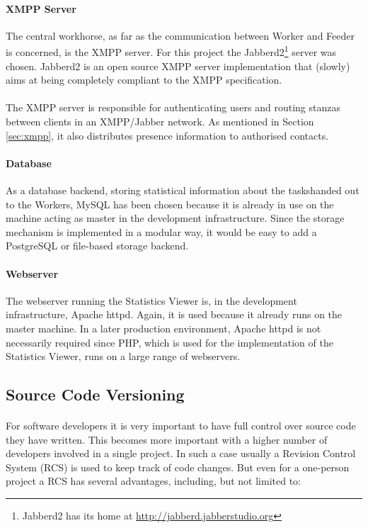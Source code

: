 \paragraph{XMPP Server}
The central workhorse, as far as the communication between Worker and Feeder is concerned, is the XMPP server. For this project the Jabberd2\footnote{Jabberd2 has its home at \href{http://jabberd.jabberstudio.org}{http://jabberd.jabberstudio.org}} server was chosen. Jabberd2 is an open source XMPP server implementation that (slowly) aims at being completely compliant to the XMPP specification.
\paragraph{}
The XMPP server is responsible for authenticating users and routing stanzas between clients in an XMPP/Jabber network. As mentioned in Section \ref{sec:xmpp}, it also distributes presence information to authorised contacts.

\paragraph{Database}
As a database backend, storing statistical information about the taskshanded out to the Workers, MySQL has been chosen because it is already in use on the machine acting as master in the development infrastructure. Since the storage mechanism is implemented in a modular way, it would be easy to add a PostgreSQL or file-based storage backend.

\paragraph{Webserver}
The webserver running the Statistics Viewer is, in the development infrastructure, Apache httpd. Again, it is used because it already runs on the master machine. In a later production environment, Apache httpd is not necessarily required since PHP, which is used for the implementation of the Statistics Viewer, runs on a large range of webservers.


\subsection{Source Code Versioning}
\paragraph{}
For software developers it is very important to have full control over source code they have written. This becomes more important with a higher number of developers involved in a single project. In such a case usually a Revision Control System (RCS) is used to keep track of code changes. But even for a one-person project a RCS has several advantages, including, but not limited to:

